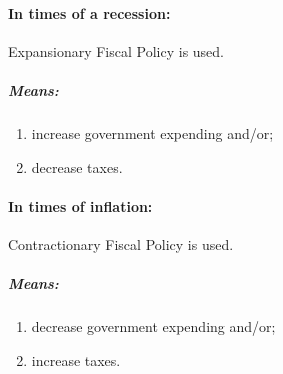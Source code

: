\paragraph{In times of a recession:} Expansionary Fiscal Policy is used.

\subparagraph{Means:}
\begin{enumerate}[label = (\alph*)]
	\item increase government expending and/or;
	\item decrease taxes.
\end{enumerate}

\paragraph{In times of inflation:} Contractionary Fiscal Policy is used.

\subparagraph{Means:}
\begin{enumerate}[label = (\alph*)]
	\item decrease government expending and/or;
	\item increase taxes.
\end{enumerate}

